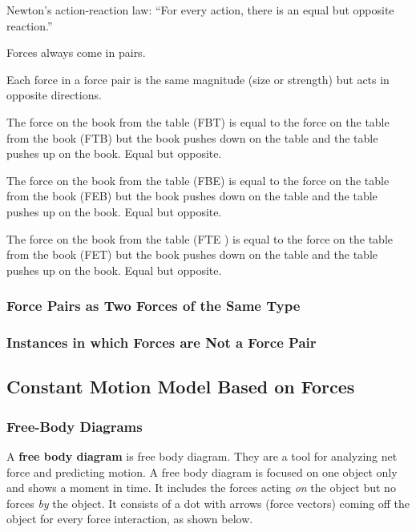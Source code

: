 \documentclass[dvipsnames]{article}
\begin{document}
Newton's action-reaction law: ``For every action, there is an equal but opposite reaction.''

Forces always come in pairs.

Each force in a force pair is the same magnitude (size or strength) but acts in opposite directions.

The force on the book from the table (FBT) is equal  to the force on the table from the book (FTB) but the book pushes down on the table and the table pushes up on the book. Equal but opposite.

The force on the book from the table (FBE) is equal  to the force on the table from the book (FEB) but the book pushes down on the table and the table pushes up on the book. Equal but opposite.

The force on the book from the table (FTE ) is equal  to the force on the table from the book (FET) but the book pushes down on the table and the table pushes up on the book. Equal but opposite.

\subsubsection{Force Pairs as Two Forces of the Same Type}

\subsubsection{Instances in which Forces are Not a Force Pair}

\subsection{Constant Motion Model Based on Forces}

\subsubsection{Free-Body Diagrams}

A \textbf{\gls{free body diagram}} is \glsdesc{free body diagram}. They are a tool for analyzing net force and predicting motion. A free body diagram is focused on one object only and shows a moment in time. It includes the forces acting \textit{on} the object but no forces \textit{by} the object. It consists of a dot with arrows (force vectors) coming off the object for every force interaction, as shown below.

\begin{center}
\end{center}
\end{document}
